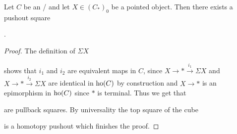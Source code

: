 \begin{lemma}\label{lem:existenceOfPoSq} %
    Let $C$ be an \inftytop/ and let $X\in \left(C_*\right)_0$ be a pointed object.
    Then there exists a pushout square  
    \begin{center}
        \;.
    \end{center}
    \begin{proof}
        The definition of $\Sigma X$
        \begin{center}
        \end{center}
        shows that $i_1$ and $i_2$ are equivalent maps in $C$, since $X\to *\xrightarrow{i_1}\Sigma X$ and $X\to *\xrightarrow{i_2}\Sigma X$ are identical in $\operatorname{ho}(C)$ by construction and $X\to *$ is an epimorphism in $\operatorname{ho}(C)$ since $*$ is terminal.
        Thus we get that 
        \begin{center}
        \end{center}
        are pullback squares.
        By universality the top square of the cube
        \begin{center}
        \end{center}
        is a homotopy pushout which finishes the proof.
    \end{proof}
\end{lemma}
